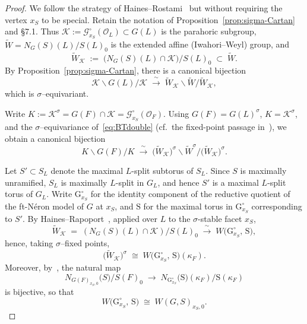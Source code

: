 \documentclass[american]{article}
\numberwithin{equation}{section}
\numberwithin{figure}{section}
\theoremstyle{plain}
\theoremstyle{definition}
\theoremstyle{remark}
\begin{document}
\begin{proof}
We follow the strategy of Haines--Rostami~\cite{hainesrostami2010} but without requiring the vertex \(x_S\) to be special.
Retain the notation of Proposition~\ref{prop:sigma-Cartan} and \S7.1. Thus
\(\mathcal K:=\mathcal G_{x_S}^{\circ}(\mathcal O_L)\subset G(L)\) is the parahoric subgroup,
\(\widetilde W=N_G(S)(L)/S(L)_0\) is the extended affine (Iwahori--Weyl) group, and
\[
  \widetilde W_{\mathcal K}\;:=\;\bigl(N_G(S)(L)\cap \mathcal K\bigr)\big/S(L)_0\;\subset\;\widetilde W.
\]
By Proposition~\ref{prop:sigma-Cartan}, there is a canonical bijection
\begin{equation}\label{eq:BTdouble}
  \mathcal K\backslash G(L)/\mathcal K\;\xrightarrow{\;\sim\;}\;
  \widetilde W_{\mathcal K}\backslash \widetilde W/\widetilde W_{\mathcal K},
\end{equation}
which is $\sigma$--equivariant.

Write \(K:=\mathcal K^{\sigma}=G(F)\cap\mathcal K=\mathcal G_{x_S}^{\circ}(\mathcal O_F)\).
Using \(G(F)=G(L)^{\sigma}\), \(K=\mathcal K^{\sigma}\), and the $\sigma$--equivariance of~\eqref{eq:BTdouble}
(cf.\ the fixed-point passage in~\cite{hainesrostami2010}), we obtain a canonical bijection
\begin{equation}\label{eq:sigmadouble}
  K\backslash G(F)/K\;\xrightarrow{\;\sim\;}\;
  \bigl(\widetilde W_{\mathcal K}\bigr)^{\sigma}\backslash \widetilde W^{\sigma}\big/\bigl(\widetilde W_{\mathcal K}\bigr)^{\sigma}.
\end{equation}

Let \(S'\subset S_L\) denote the maximal \(L\)-split subtorus of \(S_L\).
Since \(S\) is maximally unramified, \(S_L\) is maximally \(L\)-split in \(G_L\), and hence \(S'\) is a maximal
\(L\)-split torus of \(G_L\). Write \(\mathrm{G}_{x_S}^\circ\) for the identity component of the reductive quotient
of the ft-N\'eron model of \(G\) at \(x_S\), and \(\mathrm S\) for the maximal torus in \(\mathrm{G}_{x_S}^\circ\)
corresponding to \(S'\). By Haines--Rapoport~\cite[Prop.~12]{HR10}, applied over \(L\) to the \(\sigma\)-stable facet
\(x_S\),
\[
  \widetilde W_{\mathcal K}
  \;=\; (N_G(S)(L)\cap \mathcal K)\big/S(L)_0
  \;\xrightarrow{\;\sim\;}\; W\!\big(\mathrm{G}_{x_S}^\circ,\,\mathrm S\big),
\]
hence, taking \(\sigma\)--fixed points,
\[
  \bigl(\widetilde W_{\mathcal K}\bigr)^{\sigma}\;\cong\;W\!\big(\mathrm G_{x_S}^\circ,\,\mathrm S\big)(\kappa_F).
\]
Moreover, by~\cite[Lem.~3.4.10(2)]{KalethaRegSC}, the natural map
\[
  N_{G(F)_{x_S,0}}\bigl(S\bigr)\big/S(F)_0\;\longrightarrow\;
  N_{\mathrm G_{x_S}^\circ}\bigl(\mathrm{S}\bigr)(\kappa_F)\big/\mathrm{S}(\kappa_F)
\]
is bijective, so that
\begin{equation}\label{eq:WK=WGS}
  W\!\big(\mathrm G_{x_S}^\circ,\,\mathrm S\big)\;\cong\;W(G,S)_{x_S,0}.
\end{equation}


\end{proof}
\end{document}
